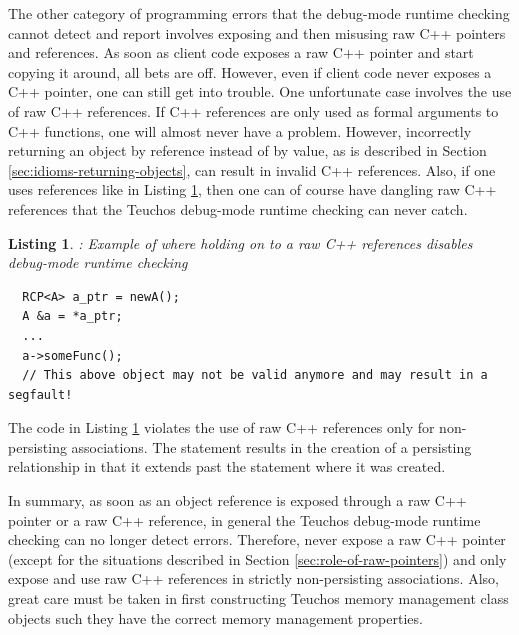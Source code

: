 \documentclass[pdf,ps2pdf,11pt]{SANDreport}
\newtheorem{listing}{Listing}
\begin{document}

The other category of programming errors that the debug-mode runtime
checking cannot detect and report involves exposing and then misusing
raw C++ pointers and references.  As soon as client code exposes a raw
C++ pointer and start copying it around, all bets are off.  However,
even if client code never exposes a C++ pointer, one can still get
into trouble.  One unfortunate case involves the use of raw C++
references.  If C++ references are only used as formal arguments to
C++ functions, one will almost never have a problem.  However,
incorrectly returning an {} object by reference instead of by
value, as is described in Section
{}\ref{sec:idioms-returning-objects}, can result in invalid C++
references.  Also, if one uses references like in Listing
{}\ref{listing:raw-ref-dangling-ref}, then one can of course have
dangling raw C++ references that the Teuchos debug-mode runtime
checking can never catch.

{}\begin{listing}: Example of where holding on to a raw C++ references
disables debug-mode runtime checking
\label{listing:raw-ref-dangling-ref}
{\small\begin{verbatim}
  RCP<A> a_ptr = newA();
  A &a = *a_ptr;
  ...
  a->someFunc();
  // This above object may not be valid anymore and may result in a segfault!
\end{verbatim}}
\end{listing}

The code in Listing {}\ref{listing:raw-ref-dangling-ref} violates the
use of raw C++ references only for non-persisting associations.  The
statement {} results in the creation of a
persisting relationship in that it extends past the statement where it
was created.

In summary, as soon as an object reference is exposed through a raw
C++ pointer or a raw C++ reference, in general the Teuchos debug-mode
runtime checking can no longer detect errors.  Therefore, never expose
a raw C++ pointer (except for the situations described in Section
{}\ref{sec:role-of-raw-pointers}) and only expose and use raw C++
references in strictly non-persisting associations.  Also, great care
must be taken in first constructing Teuchos memory management class
objects such they have the correct memory management properties.
\end{document}
